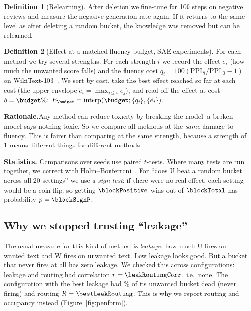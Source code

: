 \documentclass[11pt,a4paper]{article}
\theoremstyle{definition}
\newtheorem{definition}{Definition}
\newcommand{\Wb}{\mathrm{W}}
\newcommand{\Ub}{\mathrm{U}}
\newcommand{\why}[1]{\par\smallskip\noindent\textbf{Rationale.}\enspace #1\par}
\begin{document}
\begin{definition}[Relearning]
After deletion we fine-tune for 100 steps on negative reviews and measure the negative-generation
rate again. If it returns to the same level as after deleting a random bucket, the knowledge was
removed but can be relearned.
\end{definition}

\begin{definition}[Effect at a matched fluency budget, SAE experiments]
For each method we try several strengths. For each strength $i$ we record the effect $e_i$ (how
much the unwanted score falls) and the fluency cost
$q_i=100(\mathrm{PPL}_i/\mathrm{PPL}_0-1)$ on WikiText-103~\cite{merity2017wikitext}. We sort by
cost, take the best effect reached so far at each cost (the upper envelope
$\tilde e_i=\max_{j\le i}e_j$), and read off the effect at cost $b=\budget\%$:
$E_{\budget}=\mathrm{interp}(\budget;\{q_i\},\{\tilde e_i\})$.
\end{definition}

\why{Any method can reduce toxicity by breaking the model; a broken model says nothing toxic. So
we compare all methods at the \emph{same} damage to fluency. This is fairer than comparing at the
same strength, because a strength of 1 means different things for different methods.}

\textbf{Statistics.} Comparisons over seeds use paired $t$-tests. Where many tests are run together,
we correct with Holm--Bonferroni~\cite{holm1979}. For ``does $\Ub$ beat a random bucket across
all 20 settings'' we use a \emph{sign test}: if there were no real effect, each setting would be a
coin flip, so getting $\blockPositive$ wins out of $\blockTotal$ has probability $p=\blockSignP$.

\subsection{Why we stopped trusting ``leakage''}
\label{sec:leakage}
The usual measure for this kind of method is \emph{leakage}: how much $\Ub$ fires on wanted text and
$\Wb$ fires on unwanted text. Low leakage looks good. But a bucket that never fires at all has zero
leakage. We checked this across \penformConfigs{} configurations: leakage and routing had
correlation $r=\leakRoutingCorr$, i.e.\ none. The configuration with the best leakage had
\bestLeakDeadPct\% of its unwanted bucket dead (never firing) and routing
$R=\bestLeakRouting$. This is why we report routing and occupancy instead
(Figure~\ref{fig:penform}).
\end{document}
